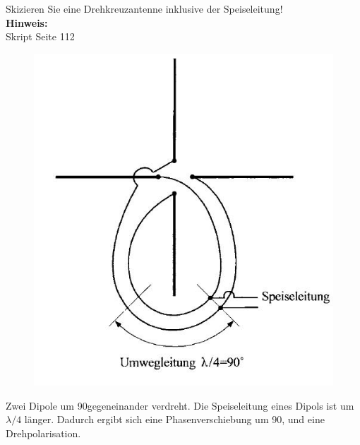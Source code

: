 \begin{question}[section=11,name={Drehkreuzantenne 2},difficulty=,quantity=6,type=thr,tags={20130314,20060816}]
	Skizieren Sie eine Drehkreuzantenne inklusive der Speiseleitung!
	\\ \textbf{Hinweis:}\\
	Skript Seite 112
\end{question}
\begin{solution}
	\begin{figure}[H]
		\includegraphics[width=14cm]{./opn/exm/thr/chp/11/3/bild.jpeg}
	\end{figure}
	Zwei Dipole um 90\degree gegeneinander verdreht. Die Speiseleitung eines Dipols ist um $\lambda/4$ länger. Dadurch ergibt sich eine Phasenverschiebung um 90\degree, und eine Drehpolarisation.
\end{solution}

